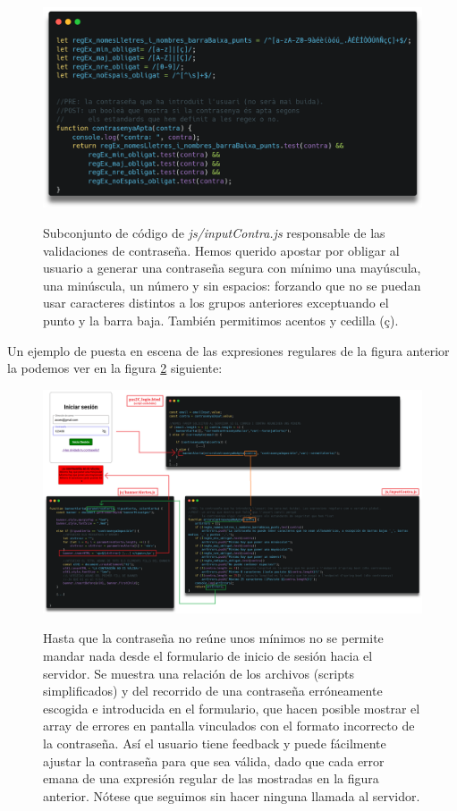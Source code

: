 \documentclass[a4paper,12pt]{report}
\begin{document}
		
		\FloatBarrier
		\setlength{\belowcaptionskip}{3pt}
		\begin{figure}[H]
			\centering
			\caption{Subconjunto de código de \textit{js/inputContra.js} responsable de las validaciones de contraseña. Hemos querido apostar por obligar al usuario a generar una contraseña segura con mínimo una mayúscula, una minúscula, un número y sin espacios: forzando que no se puedan usar caracteres distintos a los grupos anteriores exceptuando el punto y la barra baja. También permitimos acentos y cedilla (ç).}
			\includegraphics[width=.7\linewidth]{img/contrasenyaValidacioExprRegulars}
			\label{fig:contrasenyaValidacioExprRegulars}
		\end{figure}
		\FloatBarrier
		
		
		
		
		Un ejemplo de puesta en escena de las expresiones regulares de la figura anterior la podemos ver en la figura \ref{fig:activacioBannerAlertesLoginContrasenya} siguiente:
	
		
		\FloatBarrier
		\setlength{\belowcaptionskip}{3pt}
		\begin{figure}[H]
			\centering
			\caption{Hasta que la contraseña no reúne unos mínimos no se permite mandar nada desde el formulario de inicio de sesión hacia el servidor. Se muestra una relación de los archivos (scripts simplificados) y del recorrido de una contraseña erróneamente escogida e introducida en el formulario, que hacen posible mostrar el array de errores en pantalla vinculados con el formato incorrecto de la contraseña. Así el usuario tiene feedback y puede fácilmente ajustar la contraseña para que sea válida, dado que cada error emana de una expresión regular de las mostradas en la figura anterior. Nótese que seguimos sin hacer ninguna llamada al servidor.}
			\includegraphics[width=1\linewidth]{img/activacioBannerAlertesLoginContrasenya}
			\label{fig:activacioBannerAlertesLoginContrasenya}
		\end{figure}
		\FloatBarrier
		
\end{document}
